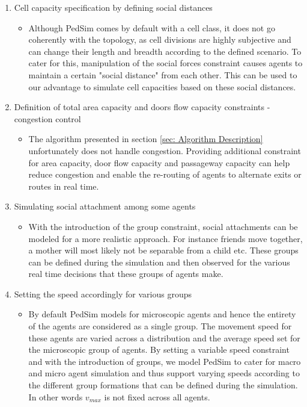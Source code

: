 \begin{enumerate}
  \item Cell capacity specification by defining social distances
  \begin{itemize}
  	\item Although PedSim comes by default with a cell class, it does not go coherently with the topology, as cell divisions are highly subjective and can change their length and breadth according to the defined scenario. To cater for this, manipulation of the social forces constraint causes agents to maintain a certain "social distance" from each other. This can be used to our advantage to simulate cell capacities based on these social distances.
  \end{itemize}
  \item Definition of total area capacity and doors flow capacity constraints -congestion control
  \begin{itemize}
  	\item The algorithm presented in section \ref{sec: Algorithm Description} unfortunately does not handle congestion. Providing additional constraint for area capacity, door flow capacity and passageway capacity can help reduce congestion and enable the re-routing of agents to alternate exits or routes in real time.
  \end{itemize}
  \item Simulating social attachment among some agents
  \begin{itemize}
  	\item With the introduction of the group constraint, social attachments can be modeled for a more realistic approach. For instance friends move together, a mother will most likely not be separable from a child etc. These groups can be defined during the simulation and then observed for the various real time decisions that these groups of agents make.
  \end{itemize}
  \item Setting the speed accordingly for various groups
  \begin{itemize}
  	\item By default PedSim models for microscopic agents and hence the entirety of the agents are considered as a single group. The movement speed for these agents are varied across a distribution and the average speed set for the microscopic group of agents. By setting a variable speed constraint and with the introduction of groups, we model PedSim to cater for macro and micro agent simulation and thus support varying speeds according to the different group formations that can be defined during the simulation. In other words $v_{max}$ is not fixed across all agents.
  \end{itemize}
\end{enumerate}

